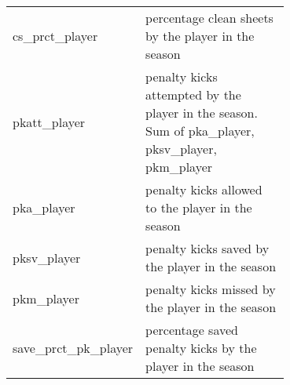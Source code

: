 \documentclass{article}
\begin{document}
\begin{longtable}{|l|p{0.7\linewidth}|}
cs\_prct\_player & percentage clean sheets by the player in the season \\
pkatt\_player & penalty kicks attempted by the player in the season. Sum of  pka\_player, pksv\_player, pkm\_player\\
pka\_player & penalty kicks allowed to the player in the season \\
pksv\_player & penalty kicks saved by the player in the season \\
pkm\_player & penalty kicks missed by the player in the season \\
save\_prct\_pk\_player & percentage saved penalty kicks by the player in the season \\
\end{longtable}
\end{document}
